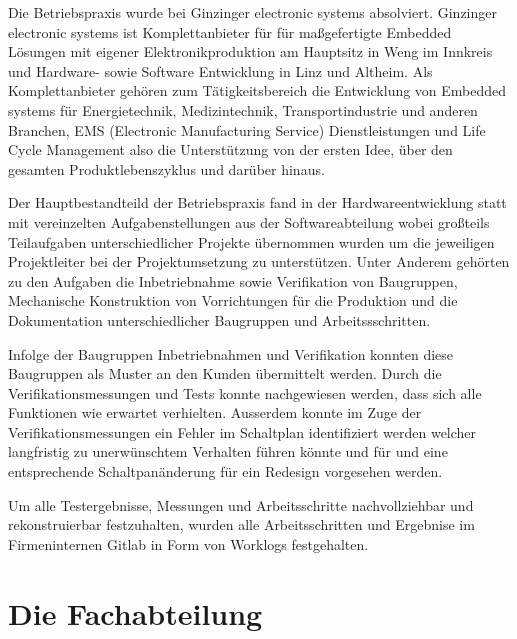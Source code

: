\documentclass[praktikum,german]{hgbthesis}
\begin{document}
\color{black}

Die Betriebspraxis wurde bei Ginzinger electronic systems absolviert. 
Ginzinger electronic systems ist Komplettanbieter für für maßgefertigte Embedded Lösungen mit 
eigener Elektronikproduktion am Hauptsitz in Weng im Innkreis und Hardware- sowie Software 
Entwicklung in Linz und Altheim. Als Komplettanbieter gehören zum Tätigkeitsbereich
die Entwicklung von Embedded systems für Energietechnik, Medizintechnik, 
Transportindustrie und anderen Branchen, EMS (Electronic Manufacturing Service) Dienstleistungen und Life Cycle Management 
also die Unterstützung von der ersten Idee, über den gesamten Produktlebenszyklus und darüber hinaus.\cite{Ginzinger}

Der Hauptbestandteild der Betriebspraxis fand in der Hardwareentwicklung statt mit vereinzelten Aufgabenstellungen 
aus der Softwareabteilung wobei großteils Teilaufgaben unterschiedlicher Projekte übernommen wurden um 
die jeweiligen Projektleiter bei der Projektumsetzung zu unterstützen. Unter Anderem gehörten zu den Aufgaben 
die Inbetriebnahme sowie Verifikation von Baugruppen, Mechanische Konstruktion von Vorrichtungen für die 
Produktion und die Dokumentation unterschiedlicher Baugruppen und Arbeitssschritten. 

Infolge der Baugruppen Inbetriebnahmen und Verifikation konnten diese Baugruppen 
als Muster an den Kunden übermittelt werden. Durch die Verifikationsmessungen und Tests
konnte nachgewiesen werden, dass sich alle Funktionen wie erwartet verhielten. Ausserdem konnte 
im Zuge der Verifikationsmessungen ein Fehler im Schaltplan identifiziert werden welcher 
langfristig zu unerwünschtem Verhalten führen könnte und für und eine entsprechende 
Schaltpanänderung für ein Redesign vorgesehen werden.

Um alle Testergebnisse, Messungen und Arbeitsschritte nachvollziehbar und rekonstruierbar festzuhalten,
wurden alle Arbeitsschritten und Ergebnise im Firmeninternen Gitlab in Form von 
Worklogs festgehalten.




\mainmatter           %

\chapter{Die Fachabteilung}
\end{document}
